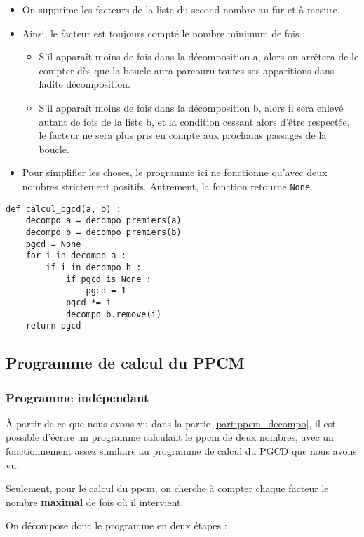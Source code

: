 \begin{itemize}
    \item On supprime les facteurs de la liste du second nombre au fur et à mesure.
    \item Ainsi, le facteur est toujours compté le nombre minimum de fois :
    \begin{itemize}
        \item S'il apparaît moins de fois dans la décomposition a, alors on arrêtera de le compter dès que la boucle aura parcouru toutes ses apparitions dans ladite décomposition.
        \item S'il apparaît moins de fois dans la décomposition b, alors il sera enlevé autant de fois de la liste b, et la condition cessant alors d'être respectée, le facteur ne sera plus pris en compte aux prochains passages de la boucle.
    \end{itemize}
    \item Pour simplifier les choses, le programme ici ne fonctionne qu'avec deux nombres strictement positifs. Autrement, la fonction retourne \texttt{None}.
\end{itemize}

\begin{verbatim}
def calcul_pgcd(a, b) :
    decompo_a = decompo_premiers(a)
    decompo_b = decompo_premiers(b)
    pgcd = None
    for i in decompo_a :
        if i in decompo_b :
            if pgcd is None :
                pgcd = 1
            pgcd *= i
            decompo_b.remove(i)
    return pgcd
\end{verbatim}

\subsection{Programme de calcul du PPCM}

\subsubsection{Programme indépendant}

À partir de ce que nous avons vu dans la partie \ref{part:ppcm_decompo}, il est possible d'écrire un programme calculant le ppcm de deux nombres, avec un fonctionnement assez similaire au programme de calcul du PGCD que nous avons vu.

Seulement, pour le calcul du ppcm, on cherche à compter chaque facteur le nombre \textbf{maximal} de fois où il intervient.

On décompose donc le programme en deux étapes :

